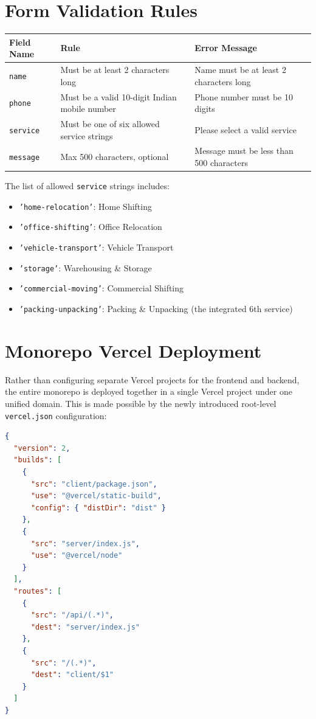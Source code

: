 \documentclass[11pt,a4paper]{article}
\begin{document}
\section{Form Validation Rules}
\begin{table}[h!]
\centering
\begin{tabularx}{\textwidth}{l X X}
\toprule
\textbf{Field Name} & \textbf{Rule} & \textbf{Error Message} \\
\midrule
\texttt{name} & Must be at least 2 characters long & Name must be at least 2 characters long \\
\texttt{phone} & Must be a valid 10-digit Indian mobile number & Phone number must be 10 digits \\
\texttt{service} & Must be one of six allowed service strings & Please select a valid service \\
\texttt{message} & Max 500 characters, optional & Message must be less than 500 characters \\
\bottomrule
\end{tabularx}
\end{table}

The list of allowed \texttt{service} strings includes:
\begin{itemize}
    \item \texttt{'home-relocation'}: Home Shifting
    \item \texttt{'office-shifting'}: Office Relocation
    \item \texttt{'vehicle-transport'}: Vehicle Transport
    \item \texttt{'storage'}: Warehousing \& Storage
    \item \texttt{'commercial-moving'}: Commercial Shifting
    \item \texttt{'packing-unpacking'}: Packing \& Unpacking (the integrated 6th service)
\end{itemize}

\section{Monorepo Vercel Deployment}
Rather than configuring separate Vercel projects for the frontend and backend, the entire monorepo is deployed together in a single Vercel project under one unified domain. This is made possible by the newly introduced root-level \texttt{vercel.json} configuration:

\begin{lstlisting}[language=json, caption=Root-level vercel.json]
{
  "version": 2,
  "builds": [
    {
      "src": "client/package.json",
      "use": "@vercel/static-build",
      "config": { "distDir": "dist" }
    },
    {
      "src": "server/index.js",
      "use": "@vercel/node"
    }
  ],
  "routes": [
    {
      "src": "/api/(.*)",
      "dest": "server/index.js"
    },
    {
      "src": "/(.*)",
      "dest": "client/$1"
    }
  ]
}
\end{lstlisting}
\end{document}
